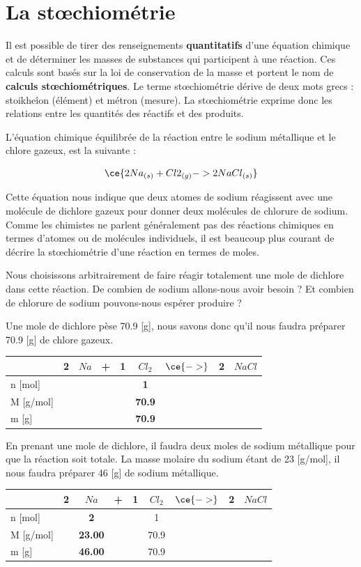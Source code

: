 \documentclass[
  11pt,
  french,
  a4paper,
  openany]{book}
\begin{document}
\hypertarget{la-stux153chiomuxe9trie}{%
\section{La stœchiométrie}\label{la-stux153chiomuxe9trie}}

Il est possible de tirer des renseignements \textbf{quantitatifs} d'une équation chimique et de déterminer les masses de substances qui participent à une réaction. Ces calculs sont basés sur la loi de conservation de la masse et portent le nom de \textbf{calculs stœchiométriques}. Le terme stœchiométrie dérive de deux mots grecs : stoikheîon (élément) et métron (mesure). La stœchiométrie exprime donc les relations entre les quantités des réactifs et des produits.

L'équation chimique équilibrée de la réaction entre le sodium métallique et le chlore gazeux, est la suivante :

\[ \ce{ 2 Na{}_{(s)} + Cl2{}_{(g)} -> 2 NaCl{}_{(s)} } \]

Cette équation nous indique que deux atomes de sodium réagissent avec une molécule de dichlore gazeux pour donner deux molécules de chlorure de sodium. Comme les chimistes ne parlent généralement pas des réactions chimiques en termes d'atomes ou de molécules individuels, il est beaucoup plus courant de décrire la stœchiométrie d'une réaction en termes de moles.

Nous choisissons arbitrairement de faire réagir totalement une mole de dichlore dans cette réaction. De combien de sodium allons-nous avoir besoin ? Et combien de chlorure de sodium pouvons-nous espérer produire ?

Une mole de dichlore pèse 70.9 {[}g{]}, nous savons donc qu'il nous faudra préparer 70.9 {[}g{]} de chlore gazeux.

\begin{longtable}[]{@{}lcccccccc@{}}
\toprule
& 2 & \(Na\) & + & 1 & \(Cl_2\) & \(\ce{->}\) & 2 & \(NaCl\)\tabularnewline
\midrule
\endhead
n {[}mol{]} & & & & & \textbf{1} & & &\tabularnewline
M {[}g/mol{]} & & & & & \textbf{70.9} & & &\tabularnewline
m {[}g{]} & & & & & \textbf{70.9} & & &\tabularnewline
\bottomrule
\end{longtable}

En prenant une mole de dichlore, il faudra deux moles de sodium métallique pour que la réaction soit totale. La masse molaire du sodium étant de 23 {[}g/mol{]}, il nous faudra préparer 46 {[}g{]} de sodium métallique.

\begin{longtable}[]{@{}lcccccccc@{}}
\toprule
& 2 & \(Na\) & + & 1 & \(Cl_2\) & \(\ce{->}\) & 2 & \(NaCl\)\tabularnewline
\midrule
\endhead
n {[}mol{]} & & \textbf{2} & & & 1 & & &\tabularnewline
M {[}g/mol{]} & & \textbf{23.00} & & & 70.9 & & &\tabularnewline
m {[}g{]} & & \textbf{46.00} & & & 70.9 & & &\tabularnewline
\bottomrule
\end{longtable}
\end{document}
